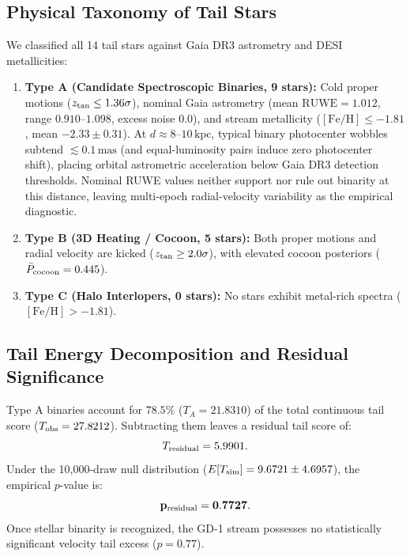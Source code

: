 \documentclass[twocolumn]{aastex631}
\begin{document}
\subsection{Physical Taxonomy of Tail Stars}
We classified all 14 tail stars against Gaia DR3 astrometry and DESI metallicities:
\begin{enumerate}
\item \textbf{Type A (Candidate Spectroscopic Binaries, 9 stars):} Cold proper motions ($z_{\rm tan} \le 1.36\sigma$), nominal Gaia astrometry (mean $\mathrm{RUWE} = 1.012$, range $0.910\text{--}1.098$, excess noise $0.0$), and stream metallicity ($\mathrm{[Fe/H]} \le -1.81$, mean $-2.33 \pm 0.31$). At $d \approx 8\text{--}10\,\mathrm{kpc}$, typical binary photocenter wobbles subtend $\lesssim 0.1\,\mathrm{mas}$ (and equal-luminosity pairs induce zero photocenter shift), placing orbital astrometric acceleration below Gaia DR3 detection thresholds. Nominal RUWE values neither support nor rule out binarity at this distance, leaving multi-epoch radial-velocity variability as the empirical diagnostic.
\item \textbf{Type B (3D Heating / Cocoon, 5 stars):} Both proper motions and radial velocity are kicked ($z_{\rm tan} \ge 2.0\sigma$), with elevated cocoon posteriors ($\bar{P}_{\rm cocoon} = 0.445$).
\item \textbf{Type C (Halo Interlopers, 0 stars):} No stars exhibit metal-rich spectra ($\mathrm{[Fe/H]} > -1.81$).
\end{enumerate}

\subsection{Tail Energy Decomposition and Residual Significance}
Type A binaries account for $78.5\%$ ($T_A = 21.8310$) of the total continuous tail score ($T_{\rm obs} = 27.8212$). Subtracting them leaves a residual tail score of:
\begin{equation}
T_{\rm residual} = 5.9901.
\end{equation}
Under the 10,000-draw null distribution ($E[T_{\rm sim}] = 9.6721 \pm 4.6957$), the empirical $p$-value is:
\begin{equation}
\mathbf{p_{\rm residual} = 0.7727}.
\end{equation}
Once stellar binarity is recognized, the GD-1 stream possesses no statistically significant velocity tail excess ($p = 0.77$).
\end{document}

